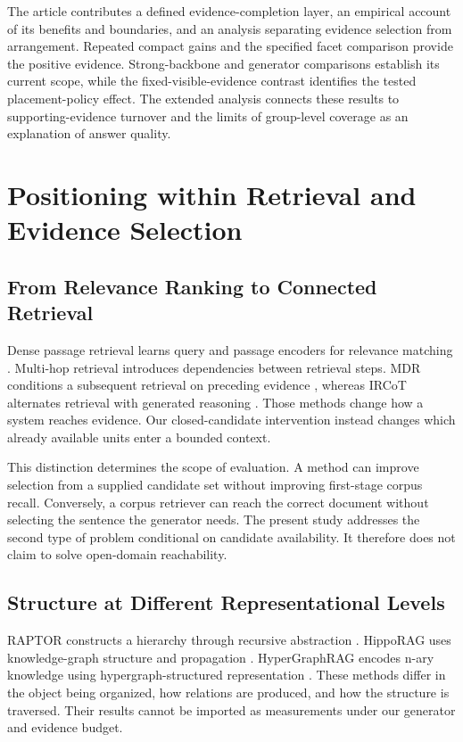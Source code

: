 \documentclass[11pt,a4paper]{article}
\begin{document}
The article contributes a defined evidence-completion layer, an empirical
account of its benefits and boundaries, and an analysis separating evidence
selection from arrangement. Repeated compact gains and the specified facet
comparison provide the positive evidence. Strong-backbone and generator
comparisons establish its current scope, while the fixed-visible-evidence
contrast identifies the tested placement-policy effect. The extended analysis
connects these results to supporting-evidence turnover and the limits of
group-level coverage as an explanation of answer quality.

\section{Positioning within Retrieval and Evidence Selection}
\subsection{From Relevance Ranking to Connected Retrieval}
Dense passage retrieval learns query and passage encoders for relevance
matching \citep{karpukhin2020dpr}. Multi-hop retrieval introduces dependencies
between retrieval steps. MDR conditions a subsequent retrieval on preceding
evidence \citep{xiong2021mdr}, whereas IRCoT alternates retrieval with generated
reasoning \citep{trivedi2023ircot}. Those methods change how a system reaches
evidence. Our closed-candidate intervention instead changes which already
available units enter a bounded context.

This distinction determines the scope of evaluation. A method can improve
selection from a supplied candidate set without improving first-stage corpus
recall. Conversely, a corpus retriever can reach the correct document without
selecting the sentence the generator needs. The present study addresses the
second type of problem conditional on candidate availability. It therefore
does not claim to solve open-domain reachability.

\subsection{Structure at Different Representational Levels}
RAPTOR constructs a hierarchy through recursive abstraction
\citep{sarthi2024raptor}. HippoRAG uses knowledge-graph structure and
propagation \citep{gutierrez2024hipporag}. HyperGraphRAG encodes n-ary
knowledge using hypergraph-structured representation
\citep{luo2025hypergraphrag}. These methods differ in the object being
organized, how relations are produced, and how the structure is traversed.
Their results cannot be imported as measurements under our generator and
evidence budget.
\end{document}
